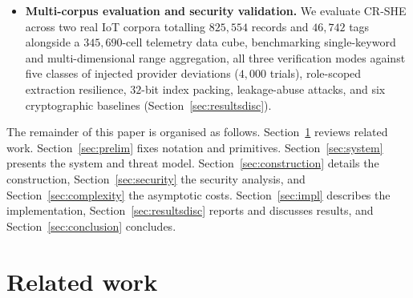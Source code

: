 \documentclass[a4paper,fleqn]{cas-sc}
\begin{document}
\begin{itemize}
\item \textbf{Multi-corpus evaluation and security validation.}
We evaluate CR-SHE across two real IoT corpora totalling $825{,}554$ records
and $46{,}742$ tags alongside a $345{,}690$-cell telemetry data cube,
benchmarking single-keyword and multi-dimensional range aggregation, all three
verification modes against five classes of injected provider deviations
($4{,}000$ trials), role-scoped extraction resilience, $32$-bit index packing,
leakage-abuse attacks, and six cryptographic baselines
(Section~\ref{sec:resultsdisc}).
\end{itemize}

The remainder of this paper is organised as follows.
Section~\ref{sec:related} reviews related work. Section~\ref{sec:prelim} fixes
notation and primitives. Section~\ref{sec:system} presents the system and
threat model. Section~\ref{sec:construction} details
the construction, Section~\ref{sec:security} the security analysis, and
Section~\ref{sec:complexity} the asymptotic costs. Section~\ref{sec:impl}
describes the implementation, Section~\ref{sec:resultsdisc} reports and
discusses results, and Section~\ref{sec:conclusion} concludes.

\section{Related work}
\label{sec:related}
\end{document}
